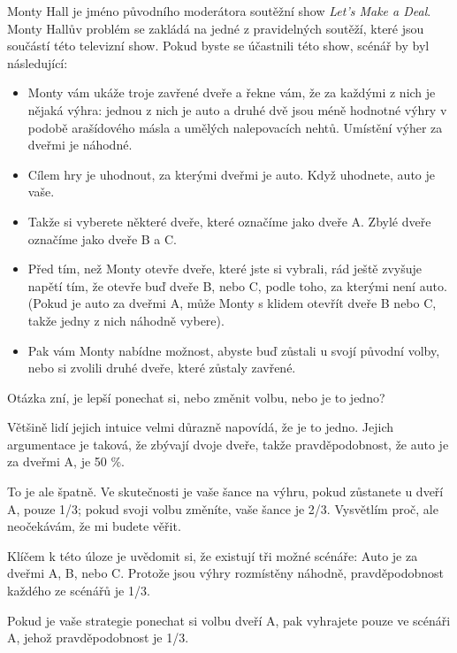 \documentclass[12pt]{book}
\begin{document}
Monty Hall je jméno původního moderátora soutěžní show {\em Let's Make a
Deal}.  Monty Hallův problém se zakládá na jedné z pravidelných soutěží, které jsou součástí této televizní show. Pokud byste se účastnili této show, scénář by byl následující:


\begin{itemize}

\item Monty vám ukáže troje zavřené dveře a řekne vám, že za každými z nich je nějaká výhra: jednou z nich je auto a druhé dvě jsou méně hodnotné výhry v podobě arašídového másla a umělých nalepovacích nehtů. Umístění výher za dveřmi je náhodné.

\item Cílem hry je uhodnout, za kterými dveřmi je auto. Když uhodnete, auto je vaše.

\item Takže si vyberete některé dveře, které označíme jako dveře A. Zbylé dveře označíme jako dveře B a C.

\item Před tím, než Monty otevře dveře, které jste si vybrali, rád ještě zvyšuje napětí tím, že otevře buď dveře B, nebo C, podle toho, za kterými není auto. (Pokud je auto za dveřmi A, může Monty s klidem otevřít dveře B nebo C, takže jedny z nich náhodně vybere).

\item Pak vám Monty nabídne možnost, abyste buď zůstali u svojí původní volby, nebo si zvolili druhé dveře, které zůstaly zavřené.

\end{itemize}

Otázka zní, je lepší ponechat si, nebo změnit volbu, nebo je to jedno?

Většině lidí jejich intuice velmi důrazně napovídá, že je to jedno. Jejich argumentace je taková, že zbývají dvoje dveře, takže pravděpodobnost, že auto je za dveřmi A, je 50 \%.

To je ale špatně. Ve skutečnosti je vaše šance na výhru, pokud zůstanete u dveří A, pouze 1/3; pokud svoji volbu změníte, vaše šance je 2/3.
Vysvětlím proč, ale neočekávám, že mi budete věřit.

Klíčem k této úloze je uvědomit si, že existují tři možné scénáře:
Auto je za dveřmi A, B, nebo C. Protože jsou výhry rozmístěny náhodně, pravděpodobnost každého ze scénářů je 1/3.

Pokud je vaše strategie ponechat si volbu dveří A, pak vyhrajete pouze ve scénáři A, jehož pravděpodobnost je 1/3.
\end{document}
